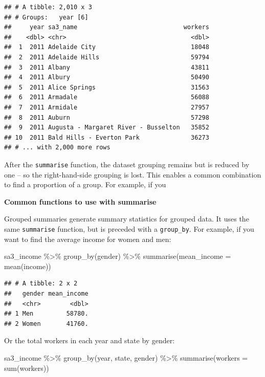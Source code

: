 \documentclass[
]{book}
\newenvironment{Shaded}{\begin{snugshade}}{\end{snugshade}}
\newcommand{\AttributeTok}[1]{\textcolor[rgb]{0.77,0.63,0.00}{#1}}
\newcommand{\FunctionTok}[1]{\textcolor[rgb]{0.00,0.00,0.00}{#1}}
\newcommand{\NormalTok}[1]{#1}
\newcommand{\SpecialCharTok}[1]{\textcolor[rgb]{0.00,0.00,0.00}{#1}}
\begin{document}
\begin{verbatim}
## # A tibble: 2,010 x 3
## # Groups:   year [6]
##     year sa3_name                             workers
##    <dbl> <chr>                                  <dbl>
##  1  2011 Adelaide City                          18048
##  2  2011 Adelaide Hills                         59794
##  3  2011 Albany                                 43811
##  4  2011 Albury                                 50490
##  5  2011 Alice Springs                          31563
##  6  2011 Armadale                               56088
##  7  2011 Armidale                               27957
##  8  2011 Auburn                                 57298
##  9  2011 Augusta - Margaret River - Busselton   35852
## 10  2011 Bald Hills - Everton Park              36273
## # ... with 2,000 more rows
\end{verbatim}

After the \texttt{summarise} function, the dataset grouping remains but is reduced by one -- so the right-hand-side grouping is lost. This enables a common combination to find a proportion of a group. For example, if you

\textbf{Common functions to use with summarise}

Grouped summaries generate summary statistics for grouped data. It uses the same \texttt{summarise} function, but is preceded with a \texttt{group\_by}. For example, if you want to find the average income for women and men:

\begin{Shaded}
\begin{Highlighting}[]
\NormalTok{sa3\_income }\SpecialCharTok{\%\textgreater{}\%} 
  \FunctionTok{group\_by}\NormalTok{(gender) }\SpecialCharTok{\%\textgreater{}\%} 
  \FunctionTok{summarise}\NormalTok{(}\AttributeTok{mean\_income =} \FunctionTok{mean}\NormalTok{(income))}
\end{Highlighting}
\end{Shaded}

\begin{verbatim}
## # A tibble: 2 x 2
##   gender mean_income
##   <chr>        <dbl>
## 1 Men         58780.
## 2 Women       41760.
\end{verbatim}

Or the total workers in each year and state by gender:

\begin{Shaded}
\begin{Highlighting}[]
\NormalTok{sa3\_income }\SpecialCharTok{\%\textgreater{}\%} 
  \FunctionTok{group\_by}\NormalTok{(year, state, gender) }\SpecialCharTok{\%\textgreater{}\%} 
  \FunctionTok{summarise}\NormalTok{(}\AttributeTok{workers =} \FunctionTok{sum}\NormalTok{(workers))}
\end{Highlighting}
\end{Shaded}
\end{document}
